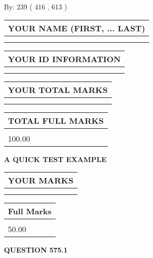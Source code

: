 \documentclass[12pt]{article}
\begin{document}
   
\hspace{1.0in} By: 
 239 ( 416 ,  613 )
   
   
   
   
\newpage 
\setcounter{page}{ 
   575001 } 
   
   
   
   
\noindent\begin{tabular}{|l|}
\hline
YOUR NAME (FIRST, ... LAST)  \\
\hline
 \\ 
 \\ 
\hline
\end{tabular}
\hspace{0.05in} \begin{tabular}{|l|}
\hline
 YOUR   ID   INFORMATION  \\
\hline
 \\ 
 \\ 
\hline
\end{tabular}
   
   
\vspace{0.2in}\noindent\begin{tabular}{|l|}
\hline
YOUR TOTAL MARKS  \\
\hline
 \\ 
 \\ 
\hline
\end{tabular}
\hspace{0.05in} \begin{tabular}{|l|}
\hline
TOTAL FULL MARKS  \\
\hline
 \\ 
100.00 \\
\hline
\end{tabular}
   
   
 \vspace{0.2in}
{\LARGE {\textbf{ A QUICK TEST EXAMPLE}}}
   
   
  
\vspace{0.2in}
  
\noindent\begin{tabular}{|l|}
\hline
 YOUR MARKS  \\
\hline
 \\ 
 \\ 
\hline
\end{tabular}
\hspace{0.05in} \begin{tabular}{|l|}
\hline
 Full Marks  \\
\hline
 \\ 
50.00 \\
\hline
\end{tabular}
{\textbf{\Large{QUESTION
575.1 
}}}
  
\end{document}
